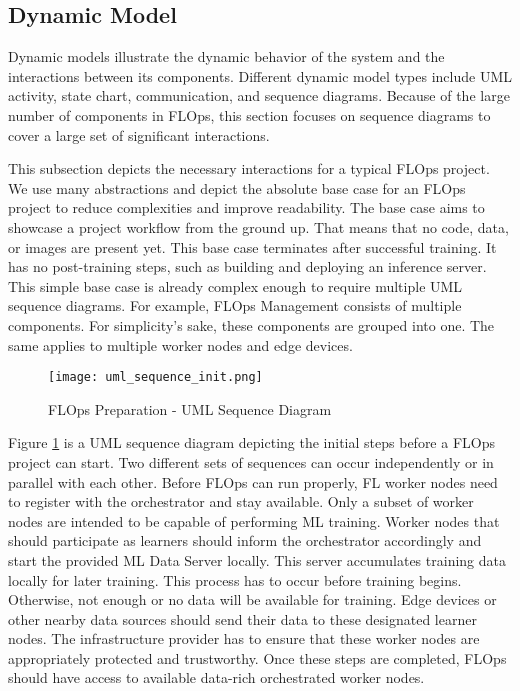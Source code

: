 \subsection{Dynamic Model}
Dynamic models illustrate the dynamic behavior of the system and the interactions between its components.
Different dynamic model types include UML activity, state chart, communication, and sequence diagrams.
Because of the large number of components in FLOps, this section focuses on sequence diagrams to cover a large set of significant interactions.

This subsection depicts the necessary interactions for a typical FLOps project.
We use many abstractions and depict the absolute base case for an FLOps project to reduce complexities and improve readability.
The base case aims to showcase a project workflow from the ground up.
That means that no code, data, or images are present yet.
This base case terminates after successful training.
It has no post-training steps, such as building and deploying an inference server.
This simple base case is already complex enough to require multiple UML sequence diagrams.
For example, FLOps Management consists of multiple components.
For simplicity's sake, these components are grouped into one. 
The same applies to multiple worker nodes and edge devices.

\begin{figure}[h]
    \begin{adjustwidth}{-0.1\paperwidth}{-0.1\paperwidth}
        \centering
        \texttt{[image: uml\_sequence\_init.png]}
        \caption{FLOps Preparation - UML Sequence Diagram}
        \label{fig:uml_sequence_init}
    \end{adjustwidth}
\end{figure}

Figure \ref{fig:uml_sequence_init} is a UML sequence diagram depicting the initial steps before a FLOps project can start.
Two different sets of sequences can occur independently or in parallel with each other.
Before FLOps can run properly, FL worker nodes need to register with the orchestrator and stay available.
Only a subset of worker nodes are intended to be capable of performing ML training.
Worker nodes that should participate as learners should inform the orchestrator accordingly and start the provided ML Data Server locally.
This server accumulates training data locally for later training.
This process has to occur before training begins.
Otherwise, not enough or no data will be available for training.
Edge devices or other nearby data sources should send their data to these designated learner nodes.
The infrastructure provider has to ensure that these worker nodes are appropriately protected and trustworthy.
Once these steps are completed, FLOps should have access to available data-rich orchestrated worker nodes.

